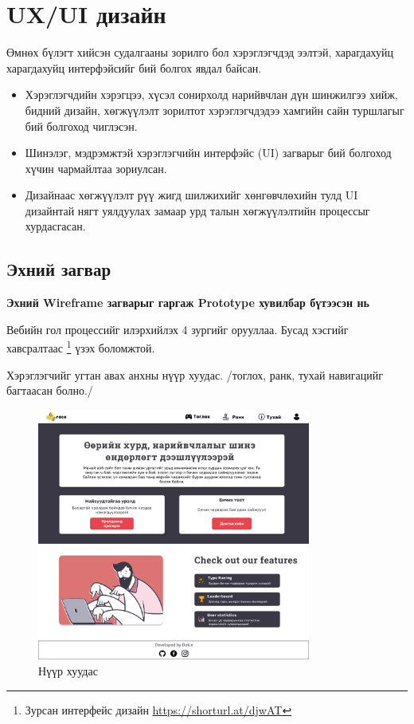 \pagebreak
\section{UX/UI дизайн}

Өмнөх бүлэгт хийсэн судалгааны зорилго бол хэрэглэгчдэд ээлтэй, харагдахуйц харагдахуйц интерфэйсийг бий болгох явдал байсан.

\begin{itemize}
	\item Хэрэглэгчдийн хэрэгцээ, хүсэл сонирхолд нарийвчлан дүн шинжилгээ хийж, бидний дизайн, хөгжүүлэлт зорилтот хэрэглэгчдэдээ хамгийн сайн туршлагыг бий болгоход чиглэсэн.
	\item Шинэлэг, мэдрэмжтэй хэрэглэгчийн интерфэйс (UI) загварыг бий болгоход хүчин чармайлтаа зориулсан.
	\item Дизайнаас хөгжүүлэлт рүү жигд шилжихийг хөнгөвчлөхийн тулд UI дизайнтай нягт уялдуулах замаар урд талын хөгжүүлэлтийн процессыг хурдасгасан.
\end{itemize}

\subsection{Эхний загвар}

\textbf{Эхний Wireframe загварыг гаргаж Prototype хувилбар бүтээсэн нь}

Вебийн гол процессийг илэрхийлэх 4 зургийг орууллаа. Бусад хэсгийг хавсралтаас \footnote{Зурсан интерфейс дизайн \url{https://shorturl.at/djwAT}} үзэх боломжтой.

\pagebreak
Хэрэглэгчийг угтан авах анхны нүүр хуудас. /тоглох, ранк, тухай навигацийг багтаасан болно./

\begin{figure}[h]
	\centering
	\includegraphics[width=9cm]{images/interfaces/ver1/mainpage.png}
	\caption{Нүүр хуудас}
	\label{fig:interface-v1-01}
\end{figure}

